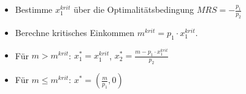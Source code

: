 \begin{kr}[Optimalität]
\begin{itemize}
			\begin{itemize}
				\item Bestimme $x_1^{krit}$ über die Optimalitätsbedingung $MRS = - \frac{p_1}{p_2}$
				\item Berechne kritisches Einkommen $m^{krit} = p_1 \cdot x_1^{krit}$. 
				\item Für $m > m^{krit}$: $x_1^* = x_1^{krit}$, $x_2^* = \frac{m - p_1 \cdot x_1^{krit}}{p_2}$
				\item Für $m \leq m^{krit}$: $x^* = (\frac{m}{p_1}, 0)$
			\end{itemize}
	\end{itemize}	
\end{kr}
